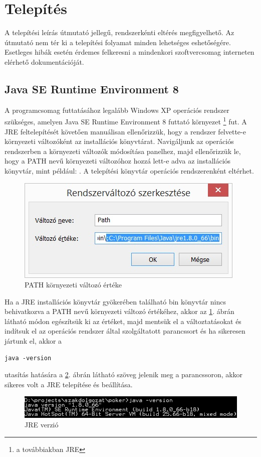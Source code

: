 \section{Telepítés}
A telepítési leírás útmutató jellegű, rendszerkénti eltérés megfigyelhető. Az útmutató nem tér ki a telepítési folyamat minden lehetséges eshetőségére. Esetleges hibák esetén érdemes felkeresni a mindenkori szoftvercsomag interneten elérhető dokumentációját.

\subsection{Java SE Runtime Environment 8}
A programcsomag futtatásához legalább Windows XP operációs rendszer szükséges, amelyen Java SE Runtime Environment 8 futtató környezet \footnote{a továbbiakban JRE} \cite{jresite} fut. A JRE feltelepítését követően manuálisan ellenőrizzük, hogy a rendszer felvette-e környezeti változóként az installációs könyvtárat. Navigáljunk az operációs rendszerben a környezeti változók módosítása panelhez, majd ellenőrizzük le, hogy a PATH nevű környezeti változóhoz hozzá lett-e adva az installációs könyvtár, mint például: . A telepítési könyvtár operációs rendszerenként eltérhet.

\begin{figure}[h!]
  \caption{PATH környezeti változó értéke}
  \label{fig:path_env}
  \centering
    \includegraphics{user-documentation/images/path_env.jpg}
\end{figure}

Ha a JRE installációs könyvtár gyökerében található bin könyvtár nincs behivatkozva a PATH nevű környezeti változó értékéhez, akkor az \ref{fig:path_env}. ábrán látható módon egészítsük ki az értéket, majd mentsük el a változtatásokat és indítsuk el az operációs rendszer által szolgáltatott parancssort és ha sikeresen jártunk el, akkor a

\begin{Verbatim}[xleftmargin=.5in]
java -version
\end{Verbatim}
utasítás hatására a \ref{fig:jre_version}. ábrán látható szöveg jelenik meg a parancssoron, akkor sikeres volt a JRE telepítése és beállítása.
\begin{figure}[h!]
  \caption{JRE verzió}
  \label{fig:jre_version}
  \centering
    \includegraphics[width=14cm]{user-documentation/images/java_version.jpg}
\end{figure}
 
